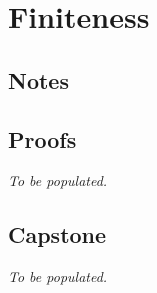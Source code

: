 \chapter{Finiteness}

\clearpage
\section{Notes}

\clearpage

\section{Proofs}
\textit{To be populated.}

\section{Capstone}
\textit{To be populated.}
